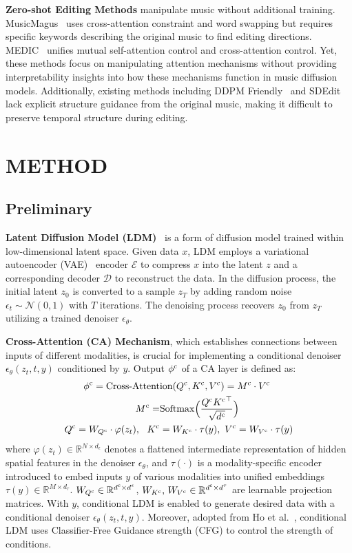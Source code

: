 \textbf{Zero-shot Editing Methods} manipulate music without additional training. MusicMagus~\cite{magus} uses cross-attention constraint and word swapping but requires specific keywords describing the original music to find editing directions. MEDIC~\cite{liu2024medic} unifies mutual self-attention control and cross-attention control. Yet, these methods focus on manipulating attention mechanisms without providing interpretability insights into how these mechanisms function in music diffusion models. Additionally, existing methods including DDPM Friendly~\cite{manor2024ddpm} and SDEdit~\cite{meng2021sdedit} 
lack explicit structure guidance from the original music, making it difficult to preserve temporal structure during editing.

\section{METHOD}
\subsection{Preliminary}
\textbf{Latent Diffusion Model (LDM)}~\cite{rombach2022high} is a form of diffusion model trained within low-dimensional latent space. Given data $x$, LDM employs a variational autoencoder (VAE)~\cite{kingma2013auto} encoder $\mathcal{E}$ to compress $x$ into the latent $z$ and a corresponding decoder $\mathcal{D}$ to reconstruct the data. In the diffusion process, the initial latent $z_0$ is converted to a sample $z_T$ by adding random noise $\epsilon_t\sim\mathcal{N}(0,1)$ with $T$ iterations. The denoising process recovers $z_0$ from $z_T$ utilizing a trained denoiser $\epsilon_\theta$.

\textbf{Cross-Attention (CA) Mechanism}, which establishes connections between inputs of different modalities, is crucial for implementing a conditional denoiser $\epsilon_\theta(z_t,t,y)$ conditioned by $y$. Output $\phi^{\rm c}$ of a CA layer is defined as:
\begin{align}
	\phi^{\rm c} = \text{Cross-Attent}&\text{ion}(Q^{\rm c},K^{\rm c},V^{\rm c}) = M^{\rm c}\cdot V^{\rm c} \\
	M^{\rm c}=&{\rm Softmax}\Big(\frac{Q^{\rm c}{K^{\rm c}}^\top}{\sqrt{d^{\rm c}}}\Big) \\
	Q^{\rm c}=W_{Q^{\rm c}}\cdot \varphi(z_t),\ \ K^{\rm c}&=W_{K^{\rm c}}\cdot \tau(y),\ V^{\rm c}=W_{V^{\rm c}}\cdot \tau(y)
\end{align}
where $\varphi(z_t)\in\mathbb{R}^{N\times d_\epsilon}$ denotes a flattened intermediate representation of hidden spatial features in the denoiser $\epsilon_\theta$, and  $\tau(\cdot)$ is a modality-specific encoder introduced to embed inputs $y$ of various modalities into unified embeddings $\tau(y)\in\mathbb{R}^{M\times d_\tau}$. $W_{Q^{\rm c}}\in\mathbb{R}^{d^{\rm c}\times d^\epsilon}$, $W_{K^{\rm c}},\, W_{V^{\rm c}}\in\mathbb{R}^{d^{\rm c}\times d^\tau}$ are learnable projection matrices. With $y$, conditional LDM is enabled to generate desired data with a conditional denoiser $\epsilon_\theta(z_t, t, y)$. Moreover, adopted from Ho et al.~\cite{ho2022classifier}, conditional LDM uses Classifier-Free Guidance strength (CFG) to control the strength of conditions.

